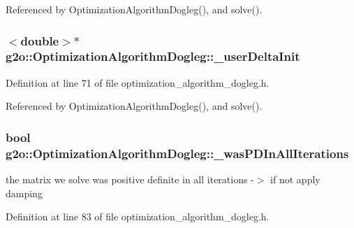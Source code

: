 Referenced by Optimization\+Algorithm\+Dogleg(), and solve().

\subsubsection[{\texorpdfstring{\+\_\+user\+Delta\+Init}{_userDeltaInit}}]{$<$double$>$$\ast$ g2o\+::\+Optimization\+Algorithm\+Dogleg\+::\+\_\+user\+Delta\+Init\hspace{0.3cm}{\ttfamily [protected]}}\hypertarget{classg2o_1_1OptimizationAlgorithmDogleg_ae77ffaea89872affeb61f122f20efeb9}{}\label{classg2o_1_1OptimizationAlgorithmDogleg_ae77ffaea89872affeb61f122f20efeb9}


Definition at line 71 of file optimization\+\_\+algorithm\+\_\+dogleg.\+h.



Referenced by Optimization\+Algorithm\+Dogleg(), and solve().

\subsubsection[{\texorpdfstring{\+\_\+was\+P\+D\+In\+All\+Iterations}{_wasPDInAllIterations}}]{\setlength{\rightskip}{0pt plus 5cm}bool g2o\+::\+Optimization\+Algorithm\+Dogleg\+::\+\_\+was\+P\+D\+In\+All\+Iterations\hspace{0.3cm}{\ttfamily [protected]}}\hypertarget{classg2o_1_1OptimizationAlgorithmDogleg_af921ebbebaf059f73e410fc751616ec2}{}\label{classg2o_1_1OptimizationAlgorithmDogleg_af921ebbebaf059f73e410fc751616ec2}


the matrix we solve was positive definite in all iterations -\/$>$ if not apply damping 



Definition at line 83 of file optimization\+\_\+algorithm\+\_\+dogleg.\+h.



